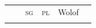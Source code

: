\documentclass[output=paper]{langscibook}
\begin{document}
\begin{tabularx}{\textwidth}{XXXXXXX}

\lsptoprule
\multicolumn{2}{c}{(8)} &  & \textsc{sg} & \multicolumn{2}{c}{ \textsc{pl}} & Wolof\\
\lspbottomrule
\end{tabularx}
\end{document}
